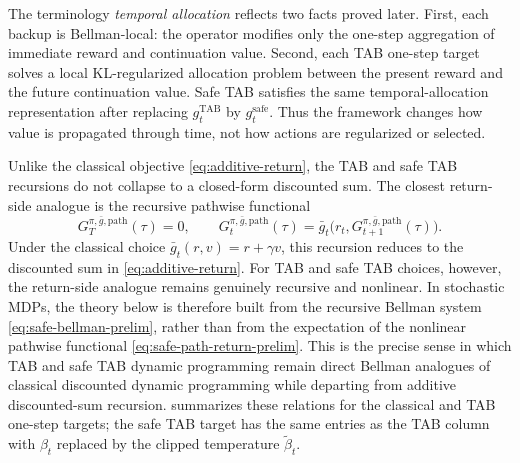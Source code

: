 \documentclass{article}
\theoremstyle{remark}
\newcommand{\safe}{\mathrm{safe}}
\begin{document}
The terminology \emph{temporal allocation} reflects two facts proved later. First, each backup is Bellman-local: the operator modifies only the one-step aggregation of immediate reward and continuation value. Second, each TAB one-step target solves a local KL-regularized allocation problem between the present reward and the future continuation value. Safe TAB satisfies the same temporal-allocation representation after replacing $g_t^{\mathrm{TAB}}$ by $g_t^{\safe}$. Thus the framework changes how value is propagated through time, not how actions are regularized or selected.

Unlike the classical objective \eqref{eq:additive-return}, the TAB and safe TAB recursions do not collapse to a closed-form discounted sum. The closest return-side analogue is the recursive pathwise functional
\begin{equation}
G_{T}^{\pi,\bar g,\mathrm{path}}(\tau)=0,
\qquad
G_{t}^{\pi,\bar g,\mathrm{path}}(\tau)
=
\bar g_t\bigl(r_t,G_{t+1}^{\pi,\bar g,\mathrm{path}}(\tau)\bigr).
\label{eq:safe-path-return-prelim}
\end{equation}
Under the classical choice $\bar g_t(r,v)=r+\gamma v$, this recursion reduces to the discounted sum in \eqref{eq:additive-return}. For TAB and safe TAB choices, however, the return-side analogue remains genuinely recursive and nonlinear. In stochastic MDPs, the theory below is therefore built from the recursive Bellman system \eqref{eq:safe-bellman-prelim}, rather than from the expectation of the nonlinear pathwise functional \eqref{eq:safe-path-return-prelim}. This is the precise sense in which TAB and safe TAB dynamic programming remain direct Bellman analogues of classical discounted dynamic programming while departing from additive discounted-sum recursion.  summarizes these relations for the classical and TAB one-step targets; the safe TAB target has the same entries as the TAB column with $\beta_t$ replaced by the clipped temperature $\widetilde\beta_t$.
\end{document}

